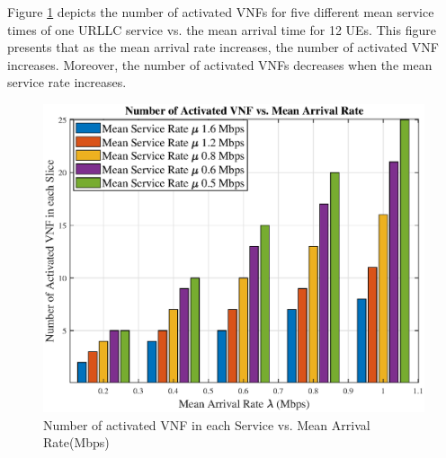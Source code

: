 \documentclass[conference]{IEEEtran}
\begin{document}

Figure \ref{fig:4} depicts the number of activated VNFs for five different mean service times of one URLLC service vs. the mean arrival time for 12 UEs. This figure presents that as the mean arrival rate increases, the number of activated VNF increases. Moreover, the number of activated VNFs decreases when the mean service rate increases.


\begin{figure}
  \centering 
    \includegraphics[scale = 0.47]{vnfNum1.eps}
  \caption{Number of activated VNF in each Service vs. Mean Arrival Rate(Mbps)}
  \label{fig:4}
\end{figure}
\end{document}
